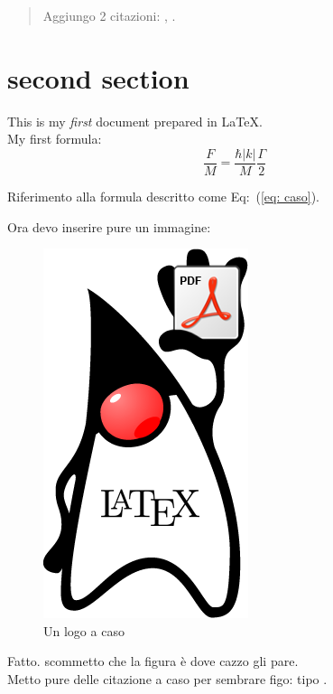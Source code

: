 \begin{abstract}
	Aggiungo 2 citazioni: \cite{Dalfovo1999}, \cite{Einstein1925}.
	\lipsum[1-2]
\end{abstract}


\section{second section}
This is my \emph{first} document prepared in \LaTeX.\\
My first formula:
\begin{equation}
\frac{F}{M} = \frac{\hbar |k| }{M} \frac{\Gamma}{2}
\label{eq: caso}
\end{equation}

Riferimento alla formula descritto come Eq:~(\ref{eq: caso}).


Ora devo inserire pure un immagine:
\begin{figure}
	\centering
	\includegraphics[scale=0.5]{Figures/logo_latex}
	\caption{Un logo a caso}
	\label{fig:_Logo}
\end{figure}
Fatto. scommetto che la figura è dove cazzo gli pare.\\

Metto pure delle citazione a caso per sembrare figo:
tipo \cite{Bose1924}.


